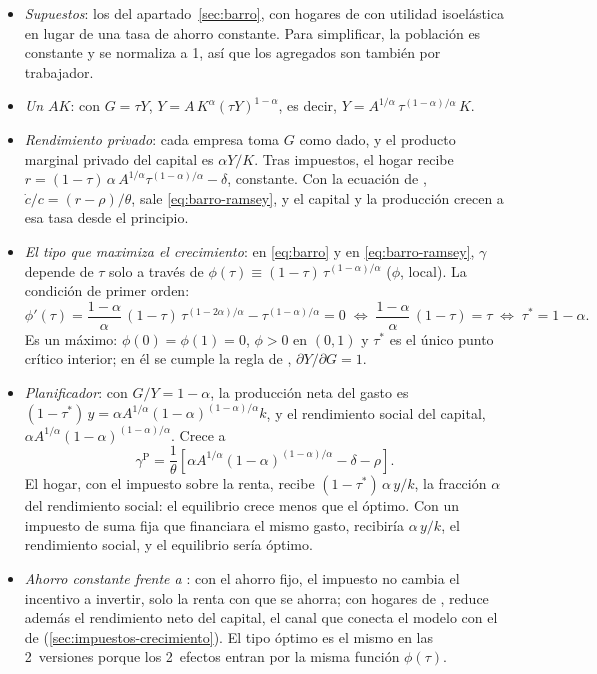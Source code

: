 \documentclass[11pt]{article}
\begin{document}
\begin{itemize}
\item \emph{Supuestos}: los del apartado~\ref{sec:barro}, con hogares de  con utilidad isoelástica en lugar de una tasa de ahorro constante. Para simplificar, la población es constante y se normaliza a 1, así que los agregados son también por trabajador.
\item \emph{Un $AK$}: con $G=\tau Y$, $Y=A\,K^{\alpha}(\tau Y)^{1-\alpha}$, es decir, $Y=A^{1/\alpha}\,\tau^{(1-\alpha)/\alpha}\,K$.
\item \emph{Rendimiento privado}: cada empresa toma $G$ como dado, y el producto marginal privado del capital es $\alpha Y/K$. Tras impuestos, el hogar recibe $r=(1-\tau)\,\alpha\,A^{1/\alpha}\tau^{(1-\alpha)/\alpha}-\delta$, constante. Con la ecuación de , $\dot c/c=(r-\rho)/\theta$, sale \eqref{eq:barro-ramsey}, y el capital y la producción crecen a esa tasa desde el principio.
\item \emph{El tipo que maximiza el crecimiento}: en \eqref{eq:barro} y en \eqref{eq:barro-ramsey}, $\gamma$ depende de $\tau$ solo a través de $\phi(\tau)\equiv(1-\tau)\,\tau^{(1-\alpha)/\alpha}$ ($\phi$, local). La condición de primer orden:
  \begin{equation*}
  \phi'(\tau)=\frac{1-\alpha}{\alpha}\,(1-\tau)\,\tau^{(1-2\alpha)/\alpha}-\tau^{(1-\alpha)/\alpha}=0\;\Longleftrightarrow\;\frac{1-\alpha}{\alpha}\,(1-\tau)=\tau\;\Longleftrightarrow\;\tau^*=1-\alpha.
  \end{equation*}
  Es un máximo: $\phi(0)=\phi(1)=0$, $\phi>0$ en $(0,1)$ y $\tau^*$ es el único punto crítico interior; en él se cumple la regla de , $\partial Y/\partial G=1$. \findemo
\item \emph{Planificador}: con $G/Y=1-\alpha$, la producción neta del gasto es $(1-\tau^*)\,y=\alpha A^{1/\alpha}(1-\alpha)^{(1-\alpha)/\alpha}k$, y el rendimiento social del capital, $\alpha A^{1/\alpha}(1-\alpha)^{(1-\alpha)/\alpha}$. Crece a
  \[\gamma^{\mathrm P}=\frac{1}{\theta}\left[\alpha A^{1/\alpha}(1-\alpha)^{(1-\alpha)/\alpha}-\delta-\rho\right].\]
  El hogar, con el impuesto sobre la renta, recibe $(1-\tau^*)\,\alpha\,y/k$, la fracción $\alpha$ del rendimiento social: el equilibrio crece menos que el óptimo. Con un impuesto de suma fija que financiara el mismo gasto, recibiría $\alpha\,y/k$, el rendimiento social, y el equilibrio sería óptimo\nocite{BarroSalaiMartin2004}. \findemo
\item \emph{Ahorro constante frente a }: con el ahorro fijo, el impuesto no cambia el incentivo a invertir, solo la renta con que se ahorra; con hogares de , reduce además el rendimiento neto del capital, el canal que conecta el modelo con el de  (\ref{sec:impuestos-crecimiento}). El tipo óptimo es el mismo en las 2~versiones porque los 2~efectos entran por la misma función $\phi(\tau)$.
\end{itemize}
\end{document}
